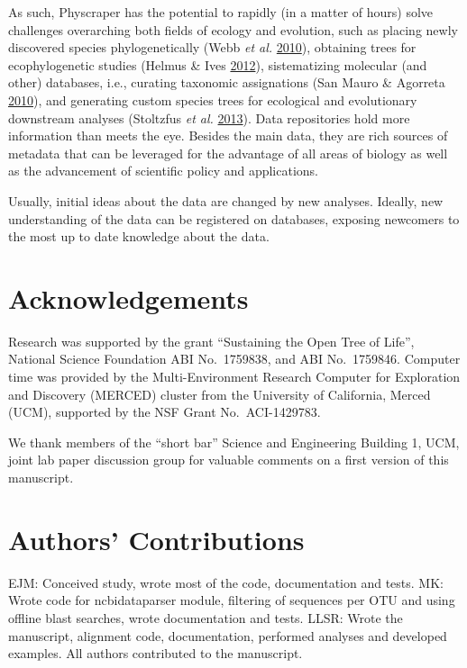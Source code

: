 \documentclass[]{article}
\begin{document}
As such, Physcraper has the potential to rapidly (in a matter of hours)
solve challenges overarching both fields of ecology and evolution, such as
placing newly discovered species phylogenetically (Webb \emph{et al.} \protect\hyperlink{ref-webb2010biodiversity}{2010}),
obtaining trees for ecophylogenetic studies (Helmus \& Ives \protect\hyperlink{ref-helmus2012phylogenetic}{2012}),
sistematizing molecular (and other) databases, i.e., curating taxonomic assignations (San Mauro \& Agorreta \protect\hyperlink{ref-san2010molecular}{2010}),
and generating custom species trees for ecological and evolutionary downstream analyses (Stoltzfus \emph{et al.} \protect\hyperlink{ref-stoltzfus2013phylotastic}{2013}).
Data repositories hold more information than meets the eye.
Besides the main data, they are rich sources of metadata that can be leveraged for the advantage of all areas of biology as well as the advancement of scientific policy and applications.

Usually, initial ideas about the data are changed by new analyses.
Ideally, new understanding of the data can be registered on databases,
exposing newcomers to the most up to date knowledge about the data.

\hypertarget{acknowledgements}{%
\section{Acknowledgements}\label{acknowledgements}}

Research was supported by the grant ``Sustaining the Open Tree of Life'', National Science Foundation ABI No.~1759838, and ABI No.~1759846.
Computer time was provided by the Multi-Environment Research Computer for Exploration and Discovery (MERCED) cluster from the University of California, Merced (UCM), supported by the NSF Grant No.~ACI-1429783.

We thank members of the ``short bar'' Science and Engineering Building 1, UCM, joint lab paper discussion group for valuable comments on a first version of this manuscript.

\hypertarget{authors-contributions}{%
\section{Authors' Contributions}\label{authors-contributions}}

EJM: Conceived study, wrote most of the code, documentation and tests.
MK: Wrote code for ncbidataparser module, filtering of sequences per OTU and using offline blast searches, wrote documentation and tests.
LLSR: Wrote the manuscript, alignment code, documentation, performed analyses and developed examples.
All authors contributed to the manuscript.
\end{document}

